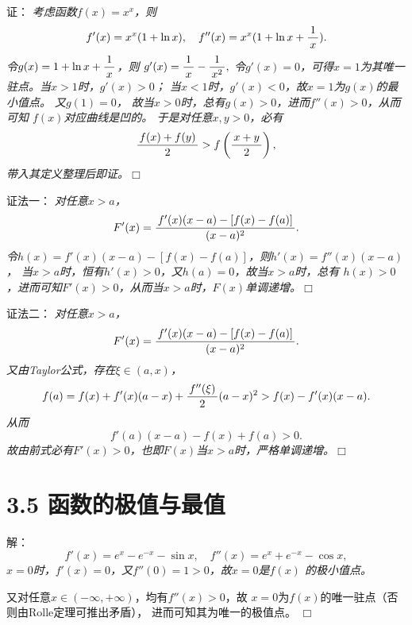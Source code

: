 \begin{frame}
	\linespread{1.5}
	
	\pause
	\small 证：\it 
	考虑函数$f(x)=x^x$，则
	$$f'(x)=x^x(1+\ln x),\quad
	f''(x)=x^x(1+\ln x+\displaystyle\frac{\,{1}\,}{\,{x}\,}).$$
	\pause 令$g(x)=1+\ln x+\displaystyle\frac{\,{1}\,}{\,{x}\,}$，则
	$g'(x)=\displaystyle\frac{\,{1}\,}{\,{x}\,}-\displaystyle\frac{\,{1}\,}{\,{x^2}\,},$
	令$g'(x)=0$，可得$x=1$为其唯一驻点。当$x>1$时，$g'(x)>0$；
	当$x<1$时，$g'(x)<0$，故$x=1$为$g(x)$的最小值点。
	\pause 又$g(1)=0$，
	故当$x>0$时，总有$g(x)>0$，进而$f''(x)>0$，从而可知
	$f(x)$对应曲线是凹的。
	\pause 于是对任意$x,y>0$，必有
	$$\displaystyle\frac{\,{f(x)+f(y)}\,}{\,{2}\,}>f\left(\displaystyle\frac{\,{x+y}\,}{\,{2}\,}\right),$$
	带入其定义整理后即证。\hfill$\Box$
\end{frame}

\begin{frame}
	\linespread{1.5}
	
	\pause
	\small 证法一：\it 
	对任意$x>a$，
	$$F'(x)=\displaystyle\frac{\,{f'(x)(x-a)-[f(x)-f(a)]}\,}{\,{(x-a)^2}\,}.$$
	令$h(x)=f'(x)(x-a)-[f(x)-f(a)]$，则$h'(x)=f''(x)(x-a)$，
	当$x>a$时，恒有$h'(x)>0$，又$h(a)=0$，故当$x>a$时，总有
	$h(x)>0$，进而可知$F'(x)>0$，从而当$x>a$时，$F(x)$单调递增。\hfill$\Box$
\end{frame}

\begin{frame}
	\linespread{1.5}
% 	
	\small 证法二：\it 
	对任意$x>a$，
	$$F'(x)=\displaystyle\frac{\,{f'(x)(x-a)-[f(x)-f(a)]}\,}{\,{(x-a)^2}\,}.$$
	又由Taylor公式，存在$\xi\in(a,x)$，
	$$f(a)=f(x)+f'(x)(a-x)+\displaystyle\frac{\,{f''(\xi)}\,}{\,{2}\,}(a-x)^2
	>f(x)-f'(x)(x-a).$$
	从而
	$$f'(a)(x-a)-f(x)+f(a)>0.$$
	故由前式必有$F'(x)>0$，也即$F(x)$当$x>a$时，严格单调递增。\hfill$\Box$
\end{frame}

\section{3.5 函数的极值与最值}

\begin{frame}
	\linespread{1.5}
	
	\pause
	\small 解：\it 
	$$f'(x)=e^x-e^{-x}-\sin x,\quad f''(x)=e^x+e^{-x}-\cos x,$$
	$x=0$时，$f'(x)=0$，又$f''(0)=1>0$，故$x=0$是$f(x)$
	的极小值点。
	
	\pause
	又对任意$x\in(-\infty,+\infty)$，均有$f''(x)>0$，故
	$x=0$为$f(x)$的唯一驻点（否则由Rolle定理可推出矛盾），
	进而可知其为唯一的极值点。
	\hfill$\Box$
\end{frame}

